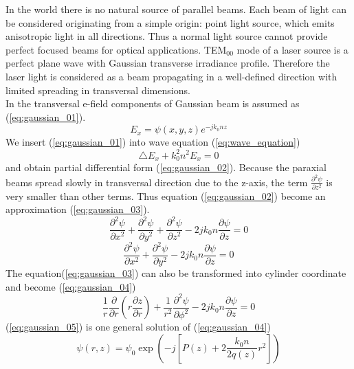 In the world there is no natural source of parallel beams. Each beam of light can be considered originating from a simple origin: point light source, which emits anisotropic light in all directions. Thus a normal light source cannot provide perfect focused beams for optical applications. TEM$_{00}$ mode of a laser source is a perfect plane wave with Gaussian transverse irradiance profile\cite{CVI_Melles_Griot_Technical_Guide}. Therefore the laser light is considered as a beam propagating in a well-defined direction with limited spreading in transversal dimensions.\\ 
In \cite{ script_FT_TET} the transversal e-field components of Gaussian beam is assumed as (\ref{eq:gaussian_01}).
\begin{equation}
E_{x}=\psi(x,y,z)e^{-jk_{0}nz}
\label{eq:gaussian_01}
\end{equation}
We insert (\ref{eq:gaussian_01}) into wave equation (\ref{eq:wave_equation})
\begin{equation}
\bigtriangleup E_{x}+k^{2}_{0}n^{2}E_{x}=0
\label{eq:wave_equation}
\end{equation}
 and obtain partial differential form (\ref{eq:gaussian_02}). Because the paraxial beams spread slowly in transversal direction due to the z-axis, the term $\frac{\partial ^{2}\psi}{\partial z^2}$ is very smaller than other terms. Thus equation (\ref{eq:gaussian_02}) become an approximation (\ref{eq:gaussian_03}).
\begin{equation}
\frac{\partial ^{2}\psi}{\partial x^2}+\frac{\partial ^{2}\psi}{\partial y^2}+\frac{ \partial ^{2}\psi}{\partial z^2}-2jk_{0}n\frac{\partial\psi}{\partial z}=0
\label{eq:gaussian_02}
\end{equation}
\begin{equation}
\frac{ \partial ^{2}\psi}{\partial x^2}+\frac{\partial ^{2}\psi}{\partial y^2}-2jk_{0}n\frac{\partial\psi}{\partial z}=0
\label{eq:gaussian_03}
\end{equation}
The equation(\ref{eq:gaussian_03}) can also be transformed into cylinder coordinate and become (\ref{eq:gaussian_04})
\begin{equation}
\frac{1}{r}\frac{\partial}{\partial r}\left(r\frac{\partial z}{\partial r}\right)+\frac{1}{r^2}\frac{ \partial ^{2}\psi}{\partial \phi^2}-2jk_{0}n\frac{\partial\psi}{\partial z}=0
\label{eq:gaussian_04}
\end{equation}
(\ref{eq:gaussian_05}) is one general solution of (\ref{eq:gaussian_04})
\begin{equation}
\psi(r,z)=\psi_{0}\exp\left(-j\left[P(z)+2 \frac{ k_{0}n}{2q(z)}r^2\right]\right)
\label{eq:gaussian_05}
\end{equation}
